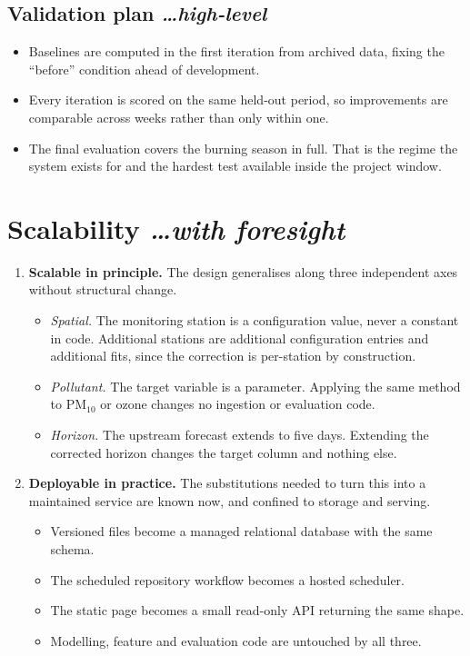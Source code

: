 \documentclass[11pt,a4paper]{article}
\newcommand{\BvrHint}[1]{%
  {\normalfont\normalsize\itshape\hfill #1}}
\begin{document}
\subsection{Validation plan %
\BvrHint{\ldots high-level}}
\begin{itemize}[leftmargin=0.7cm]
  \item Baselines are computed in the first iteration
    from archived data, fixing the ``before'' condition
    ahead of development.
  \item Every iteration is scored on the same held-out
    period, so improvements are comparable across weeks
    rather than only within one.
  \item The final evaluation covers the burning season
    in full. That is the regime the system exists for
    and the hardest test available inside the project
    window.
\end{itemize}

\section{Scalability %
\BvrHint{\ldots with foresight}}

\begin{enumerate}[leftmargin=0.7cm]
  \item \textbf{Scalable in principle.} The design
    generalises along three independent axes without
    structural change.
    \begin{itemize}[leftmargin=0.7cm]
      \item \emph{Spatial.} The monitoring station is a
        configuration value, never a constant in code.
        Additional stations are additional configuration
        entries and additional fits, since the
        correction is per-station by construction.
      \item \emph{Pollutant.} The target variable is a
        parameter. Applying the same method to
        PM$_{10}$ or ozone changes no ingestion or
        evaluation code.
      \item \emph{Horizon.} The upstream forecast
        extends to five days. Extending the corrected
        horizon changes the target column and nothing
        else.
    \end{itemize}
  \item \textbf{Deployable in practice.} The
    substitutions needed to turn this into a maintained
    service are known now, and confined to storage and
    serving.
    \begin{itemize}[leftmargin=0.7cm]
      \item Versioned files become a managed relational
        database with the same schema.
      \item The scheduled repository workflow becomes a
        hosted scheduler.
      \item The static page becomes a small read-only
        API returning the same shape.
      \item Modelling, feature and evaluation code are
        untouched by all three.
    \end{itemize}
\end{enumerate}
\end{document}

